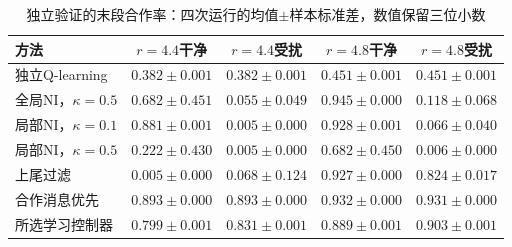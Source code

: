 \begin{table}[!htbp]
\centering\small
\caption{独立验证的末段合作率：四次运行的均值$\pm$样本标准差，数值保留三位小数}
\label{tab:w2-validation}
\begin{tabular}{lcccc}
\toprule
方法 & $r=4.4$干净 & $r=4.4$受扰 & $r=4.8$干净 & $r=4.8$受扰 \\
\midrule
独立Q-learning & $0.382\pm0.001$ & $0.382\pm0.001$ & $0.451\pm0.001$ & $0.451\pm0.001$ \\
全局NI，$\kappa=0.5$ & $0.682\pm0.451$ & $0.055\pm0.049$ & $0.945\pm0.000$ & $0.118\pm0.068$ \\
局部NI，$\kappa=0.1$ & $0.881\pm0.001$ & $0.005\pm0.000$ & $0.928\pm0.001$ & $0.066\pm0.040$ \\
局部NI，$\kappa=0.5$ & $0.222\pm0.430$ & $0.005\pm0.000$ & $0.682\pm0.450$ & $0.006\pm0.000$ \\
上尾过滤 & $0.005\pm0.000$ & $0.068\pm0.124$ & $0.927\pm0.000$ & $0.824\pm0.017$ \\
合作消息优先 & $0.893\pm0.000$ & $0.893\pm0.000$ & $0.932\pm0.000$ & $0.931\pm0.000$ \\
所选学习控制器 & $0.799\pm0.001$ & $0.831\pm0.001$ & $0.889\pm0.001$ & $0.903\pm0.001$ \\
\bottomrule
\end{tabular}
\par{}
\end{table}
